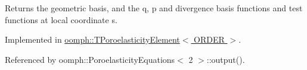 Returns the geometric basis, and the q, p and divergence basis functions and test functions at local coordinate s. 



Implemented in \hyperlink{classoomph_1_1TPoroelasticityElement_a309bfa8c38a43d062ffe7395e32e6d5f}{oomph\+::\+T\+Poroelasticity\+Element$<$ O\+R\+D\+E\+R $>$}.



Referenced by oomph\+::\+Poroelasticity\+Equations$<$ 2 $>$\+::output().

\mbox{\label{classoomph_1_1PoroelasticityEquations_a1fe3d6550d835f62011be7c2c1aa5765}} 
